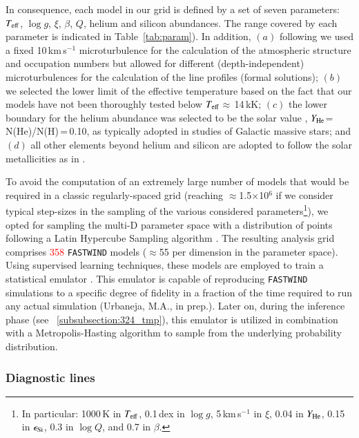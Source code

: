 \documentclass{aa}
\newcommand{\vmic}{$\xi$\xspace}
\newcommand{\Teff}{\mbox{$T_{\rm eff}$}\xspace}
\newcommand{\logg}{\mbox{$\log g$}\xspace}
\newcommand{\logQ}{\mbox{$\log Q$}\xspace}
\newcommand{\He}{$Y_{\rm He}$\xspace}
\newcommand{\kms}{\,\mbox{km\,s$^{-1}$}\xspace}
\newcommand{\num}[1]{\textcolor{red}{#1}}
\begin{document}
In consequence, each model in our grid is defined by a set of seven parameters: \Teff, \logg, \vmic, $\beta$, $Q$, helium and silicon abundances. The range covered by each parameter is indicated in Table~\ref{tab:param}). In addition, 
$(a)$ following \citet{urbaneja11} we used a fixed 10\kms microturbulence for the calculation of the atmospheric structure and occupation numbers but allowed for different (depth-independent) microturbulences for the calculation of the line profiles (formal solutions); 
$(b)$ we selected the lower limit of the effective temperature based on the fact that our models have not been thoroughly tested below \Teff$\approx$\,14\,kK;
$(c)$ the lower boundary for the helium abundance was selected to be the solar value \citep{magg22}, \He=\,N(He)/N(H)\,=\,0.10, as typically adopted in studies of Galactic massive stars; and 
$(d)$ all other elements beyond helium and silicon are adopted to follow the solar metallicities as in \citet{asplund09}.

To avoid the computation of an extremely large number of models that would be required in a classic regularly-spaced grid (reaching $\approx$1.5$\times$10$^{6}$ if we consider typical step-sizes in the sampling of the various considered parameters\footnote{In particular: 1000\,K in \Teff, 0.1\,dex in \logg, 5\kms in \vmic, 0.04 in \He, 0.15 in $\epsilon_{\rm Si}$, 0.3 in \logQ, and 0.7 in $\beta$.}), we opted for sampling the multi-D parameter space with a distribution of points following a Latin Hypercube Sampling algorithm \citep[LHS;][]{mckay79, wei-liem96}. The resulting analysis grid comprises \num{358} {\tt FASTWIND} models ($\approx$55 per dimension in the parameter space). Using supervised learning techniques, these models are employed to train a statistical emulator \citep{mackay03}. This emulator is capable of reproducing {\tt FASTWIND} simulations to a specific degree of fidelity in a fraction of the time required to run any actual simulation (Urbaneja, M.A., in prep.). Later on, during the inference phase (see ~\ref{subsubsection:324_tmp}), this emulator is utilized in combination with a Metropolis-Hasting algorithm \citep{metropolis53} to sample from the underlying probability distribution.


\subsubsection{Diagnostic lines}
\label{subsubsection:323_tmp}
\end{document}
